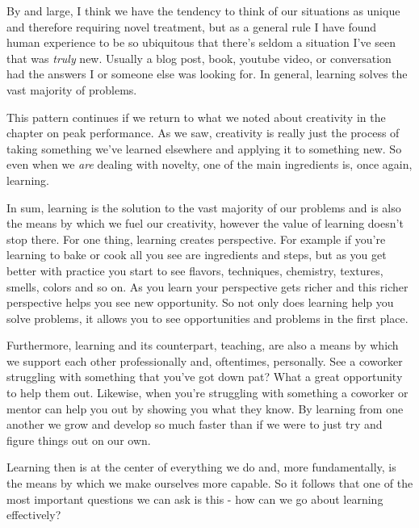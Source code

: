 \documentclass[11pt]{book}
\begin{document}
By and large, I think we have the tendency to think of our situations as unique and therefore requiring novel treatment, but as a general rule I have found human experience to be so ubiquitous that there's seldom a situation I've seen that was \textit{truly} new. Usually a blog post, book, youtube video, or conversation had the answers I or someone else was looking for. In general, learning solves the vast majority of problems.
\newline

This pattern continues if we return to what we noted about creativity in the chapter on peak performance. As we saw, creativity is really just the process of taking something we've learned elsewhere and applying it to something new. So even when we \textit{are} dealing with novelty, one of the main ingredients is, once again, learning.  
\newline

In sum, learning is the solution to the vast majority of our problems and is also the means by which we fuel our creativity, however the value of learning doesn't stop there. For one thing, learning creates perspective. For example if you're learning to bake or cook all you see are ingredients and steps, but as you get better with practice you start to see flavors, techniques, chemistry, textures, smells, colors and so on. As you learn your perspective gets richer and this richer perspective helps you see new opportunity. So not only does learning help you solve problems, it allows you to see opportunities and problems in the first place.
\newline

Furthermore, learning and its counterpart, teaching, are also a means by which we support each other professionally and, oftentimes, personally. See a coworker struggling with something that you've got down pat? What a great opportunity to help them out. Likewise, when you're struggling with something a coworker or mentor can help you out by showing you what they know. By learning from one another we grow and develop so much faster than if we were to just try and figure things out on our own.
\newline

Learning then is at the center of everything we do and, more fundamentally, is the means by which we make ourselves more capable. So it follows that one of the most important questions we can ask is this - how can we go about learning effectively? 
\end{document}
